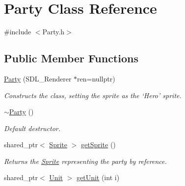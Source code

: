 \hypertarget{class_party}{}\section{Party Class Reference}
\label{class_party}


{\ttfamily \#include $<$Party.\+h$>$}

\subsection*{Public Member Functions}
\begin{DoxyCompactItemize}
\item 
\hyperlink{class_party_a2ac633ed4c5b4171c463a6db02048291}{Party} (S\+D\+L\+\_\+\+Renderer $\ast$ren=nullptr)\hypertarget{class_party_a2ac633ed4c5b4171c463a6db02048291}{}\label{class_party_a2ac633ed4c5b4171c463a6db02048291}

\begin{DoxyCompactList}\small\item\em Constructs the class, setting the sprite as the ‘\+Hero’ sprite. \end{DoxyCompactList}\item 
\hyperlink{class_party_a85aa837e38a06690e6fee5087d7c7ad7}{$\sim$\+Party} ()\hypertarget{class_party_a85aa837e38a06690e6fee5087d7c7ad7}{}\label{class_party_a85aa837e38a06690e6fee5087d7c7ad7}

\begin{DoxyCompactList}\small\item\em Default destructor. \end{DoxyCompactList}\item 
shared\+\_\+ptr$<$ \hyperlink{class_sprite}{Sprite} $>$ \hyperlink{class_party_a7f8bf409daa7750d0ce103841c437f27}{get\+Sprite} ()\hypertarget{class_party_a7f8bf409daa7750d0ce103841c437f27}{}\label{class_party_a7f8bf409daa7750d0ce103841c437f27}

\begin{DoxyCompactList}\small\item\em Returns the \hyperlink{class_sprite}{Sprite} representing the party by reference. \end{DoxyCompactList}\item 
shared\+\_\+ptr$<$ \hyperlink{class_unit}{Unit} $>$ \hyperlink{class_party_af883dfce54f0f2535ae45ac01e3121d9}{get\+Unit} (int i)\hypertarget{class_party_af883dfce54f0f2535ae45ac01e3121d9}{}\label{class_party_af883dfce54f0f2535ae45ac01e3121d9}


\end{DoxyCompactItemize}
